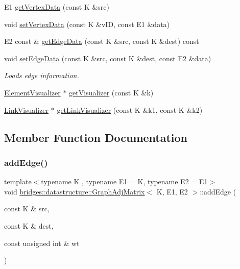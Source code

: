 \begin{DoxyCompactItemize}
\item 
E1 \mbox{\hyperlink{classbridges_1_1datastructure_1_1_graph_adj_matrix_a0be12527de2ab43b9de9b7ccd6e94d94}{get\+Vertex\+Data}} (const K \&src)
\item 
void \mbox{\hyperlink{classbridges_1_1datastructure_1_1_graph_adj_matrix_a8fb501cd1b1953c85e2aa3963f8ecd1f}{set\+Vertex\+Data}} (const K \&v\+ID, const E1 \&data)
\item 
E2 const  \& \mbox{\hyperlink{classbridges_1_1datastructure_1_1_graph_adj_matrix_ab6cd22b1a8f1e9f1c0865ba7aec6c6ca}{get\+Edge\+Data}} (const K \&src, const K \&dest) const
\item 
void \mbox{\hyperlink{classbridges_1_1datastructure_1_1_graph_adj_matrix_a9367d6bee5ce194bad2c8ca105d5be2f}{set\+Edge\+Data}} (const K \&src, const K \&dest, const E2 \&data)
\begin{DoxyCompactList}\small\item\em Loads edge information. \end{DoxyCompactList}\item 
\mbox{\hyperlink{classbridges_1_1datastructure_1_1_element_visualizer}{Element\+Visualizer}} $\ast$ \mbox{\hyperlink{classbridges_1_1datastructure_1_1_graph_adj_matrix_ad17ebd77b7fd42bd440aa5bbf313c752}{get\+Visualizer}} (const K \&k)
\item 
\mbox{\hyperlink{classbridges_1_1datastructure_1_1_link_visualizer}{Link\+Visualizer}} $\ast$ \mbox{\hyperlink{classbridges_1_1datastructure_1_1_graph_adj_matrix_ab41a062af77b11e5cc034f7c21d12421}{get\+Link\+Visualizer}} (const K \&k1, const K \&k2)
\end{DoxyCompactItemize}


\subsection{Member Function Documentation}
\mbox{\label{classbridges_1_1datastructure_1_1_graph_adj_matrix_ab23870ac203b3784157ecb05443494a4}} 
\subsubsection{\texorpdfstring{addEdge()}{addEdge()}}
{\footnotesize\ttfamily template$<$typename K , typename E1  = K, typename E2  = E1$>$ \\
void \mbox{\hyperlink{classbridges_1_1datastructure_1_1_graph_adj_matrix}{bridges\+::datastructure\+::\+Graph\+Adj\+Matrix}}$<$ K, E1, E2 $>$\+::add\+Edge (\begin{DoxyParamCaption}\item[{const K \&}]{src,  }\item[{const K \&}]{dest,  }\item[{const unsigned int \&}]{wt }\end{DoxyParamCaption})\hspace{0.3cm}{\ttfamily [inline]}}


